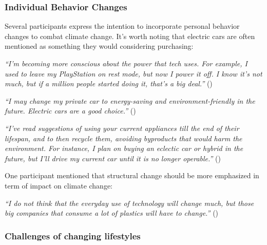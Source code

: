     \subsubsection{Individual Behavior Changes}
    
    Several participants express the intention to incorporate personal behavior changes to combat climate change. It's worth noting that electric cars are often mentioned as something they would considering purchasing:
    
    \begin{quoting}
        \textit{``I'm becoming more conscious about the power that tech uses. For example, I used to leave my PlayStation on rest mode, but now I power it off. I know it's not much, but if a million people started doing it, that's a big deal.''} () %
    \end{quoting}
    
    \begin{quoting}
        \textit{``I may change my private car to energy-saving and environment-friendly in the future. Electric cars are a good choice.''} ()
    \end{quoting}
    

    \begin{quoting}
        \textit{``I've read suggestions of using your current appliances till the end of their lifespan, and to then recycle them, avoiding byproducts that would harm the environment. For instance, I plan on buying an eclectic car or hybrid in the future, but I'll drive my current car until it is no longer operable.''} ()
    \end{quoting}
    
    One participant mentioned that structural change should be more emphasized in term of impact on climate change:
    
    \begin{quoting}
        \textit{``I do not think that the everyday use of technology will change much, but those big companies that consume a lot of plastics will have to change.''} ()
    \end{quoting}
    
    \subsubsection{Challenges of changing lifestyles}
    
